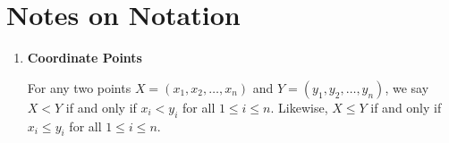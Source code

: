 \section{Notes on Notation}

\begin{enumerate}
\item \textbf{Coordinate Points}

For any two points $X = (x_1, x_2, \hdots, x_n)$ and $Y = (y_1, y_2, \hdots, y_n)$, we say $X < Y$ if and only if $x_i < y_i$ for all $1 \leq i \leq n$. Likewise, $X \leq Y$ if and only if $x_i \leq y_i$  for all $1 \leq i \leq n$.
\end{enumerate}
